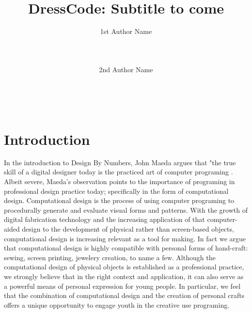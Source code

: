 \documentclass{sigchi}
\begin{document}
\title{DressCode: Subtitle to come}

\author{
 \alignauthor 1st Author Name\\
 \\
 \\
 \\
 \alignauthor 2nd Author Name\\
 \\
 \\
 \\
}

\maketitle

\begin{abstract}
\end{abstract}



\section{Introduction} %
In the introduction to Design By Numbers, John Maeda argues that "the true skill of a digital designer today is the practiced art of computer programing \cite{maeda}. Albeit severe, Maeda's observation points to the importance of programing in professional design practice today; specifically in the form of computational design. Computational design is the process of using computer programing to procedurally generate and evaluate visual forms and patterns. With the growth of digital fabrication technology and the increasing application of that computer-aided design to the development of physical rather than screen-based objects, computational design is increasing relevant as a tool for making. In fact we argue that computational design is highly compatible with personal forms of hand-craft: sewing, screen printing, jewelery creation, to name a few. Although the computational design of physical objects is established as a professional practice, we strongly believe that in the right context and application, it can also serve as a powerful means of personal expression for young people. In particular, we feel that the combination of computational design and the creation of personal crafts offers a unique opportunity to engage youth in the creative use programing.%
\end{document}
